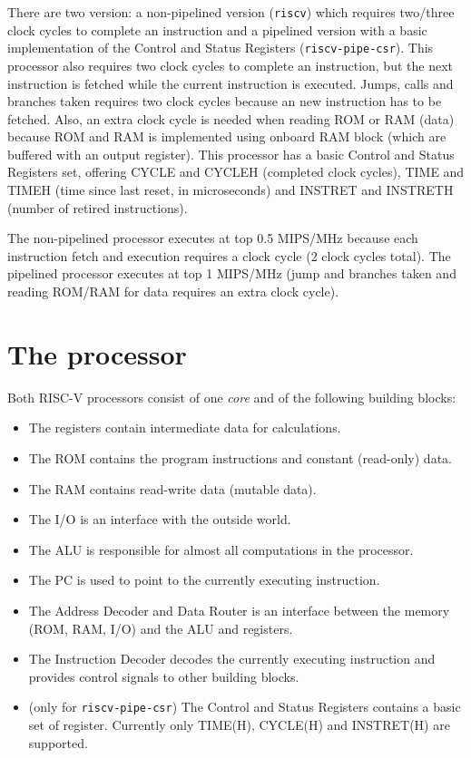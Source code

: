 \documentclass[12pt]{article}
\begin{document}
There are two version: a non-pipelined version (\texttt{riscv}) which requires two/three clock cycles to complete an instruction and a pipelined version with a basic implementation of the Control and Status Registers (\texttt{riscv-pipe-csr}). This processor also requires two clock cycles to complete an instruction, but the next instruction is fetched while the current instruction is executed. Jumps, calls and branches taken requires two clock cycles because an new instruction has to be fetched. Also, an extra clock cycle is needed when reading ROM or RAM (data) because ROM and RAM is implemented using onboard RAM block (which are buffered with an output register). This processor has a basic Control and Status Registers set, offering CYCLE and CYCLEH (completed clock cycles), TIME and TIMEH (time since last reset, in microseconds) and INSTRET and INSTRETH (number of retired instructions).

The non-pipelined processor executes at top 0.5 MIPS/MHz because each instruction fetch and execution requires a clock cycle (2 clock cycles total). The pipelined processor executes at top 1 MIPS/MHz (jump and branches taken and reading ROM/RAM for data requires an extra clock cycle).
 
\section{The processor}
Both RISC-V processors consist of one \textit{core} and of the following building blocks:

\begin{itemize}
\item The registers contain intermediate data for calculations.
\item The ROM contains the program instructions and constant (read-only) data.
\item The RAM contains read-write data (mutable data).
\item The I/O is an interface with the outside world.
\item The ALU is responsible for almost all computations in the processor.
\item The PC is used to point to the currently executing instruction.
\item The Address Decoder and Data Router is an interface between the memory (ROM, RAM, I/O) and the ALU and registers.
\item The Instruction Decoder decodes the currently executing instruction and provides control signals to other building blocks.
\item (only for \texttt{riscv-pipe-csr}) The Control and Status Registers contains a basic set of register. Currently only TIME(H), CYCLE(H) and INSTRET(H) are supported.
\end{itemize}
\end{document}
